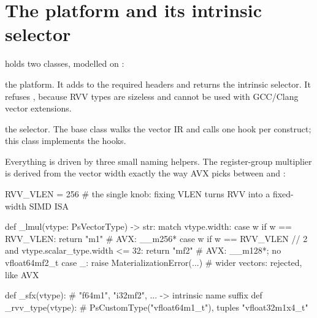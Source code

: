 \section{The platform and its intrinsic selector}\label{r02:sec:ps-platform}

 holds two classes, modelled on :
\begin{description}[style=nextline]
  \item[\cls{RvvCpu}(\cls{GenericVectorCpu})] the platform. It adds
     to the required headers and returns the
    intrinsic selector. It refuses , because RVV types
    are sizeless and cannot be used with GCC/Clang vector extensions.
  \item[\cls{SelectIntrinsicsRvv}(\cls{SelectIntrinsics})] the selector. The base class
    walks the vector IR and calls one hook per construct; this class implements the
    hooks.
\end{description}
Everything is driven by three small naming helpers. The register-group multiplier is
derived from the vector width exactly the way AVX picks between  and
:
\begin{pycode}[nolol=false,caption={[Type naming in the RVV platform]Type naming in \texttt{backend/platforms/rvv.py}.},label=r02:lst:lmul]
RVV_VLEN = 256   # the single knob: fixing VLEN turns RVV into a fixed-width SIMD ISA

def _lmul(vtype: PsVectorType) -> str:
    match vtype.width:
        case w if w == RVV_VLEN:
            return "m1"                                   # AVX: __m256*
        case w if w == RVV_VLEN // 2 and vtype.scalar_type.width <= 32:
            return "mf2"                                  # AVX: __m128*; no vfloat64mf2_t
        case _:
            raise MaterializationError(...)               # wider vectors: rejected, like AVX

def _sfx(vtype):      # "f64m1", "i32mf2", ...  -> intrinsic name suffix
def _rvv_type(vtype): # PsCustomType("vfloat64m1_t"), tuples "vfloat32m1x4_t"
\end{pycode}


